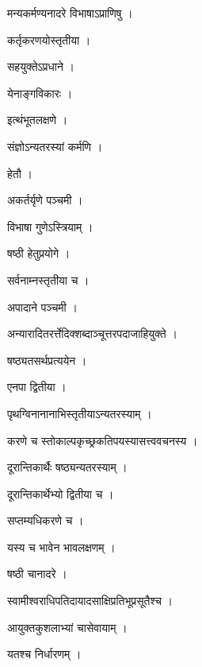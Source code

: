 \documentclass[10pt, openany]{book}
\begin{document}
\noindent मन्यकर्मण्यनादरे विभाषाऽप्राणिषु ।

\noindent कर्तृकरणयोस्तृतीया ।

\noindent सहयुक्तेऽप्रधाने ।

\noindent येनाङ्गविकारः ।

\noindent इत्थंभूतलक्षणे ।

\noindent संज्ञोऽन्यतरस्यां कर्मणि ।

\noindent हेतौ ।

\noindent अकर्तर्यृणे पञ्चमी ।

\noindent विभाषा गुणेऽस्त्रियाम् ।

\noindent षष्ठी हेतुप्रयोगे ।

\noindent सर्वनाम्नस्तृतीया च ।

\noindent अपादाने पञ्चमी ।

\noindent अन्यारादितरर्त्तेदिक्शब्दाञ्चूत्तरपदाजाहियुक्ते ।

\noindent षष्ठ्यतसर्थप्रत्ययेन ।

\noindent एनपा द्वितीया ।

\noindent पृथग्विनानानाभिस्तृतीयाऽन्यतरस्याम् ।

\noindent करणे च स्तोकाल्पकृच्छ्रकतिपयस्यासत्त्ववचनस्य ।

\noindent दूरान्तिकार्थैः षष्ठ्यन्यतरस्याम् ।

\noindent दूरान्तिकार्थेभ्यो द्वितीया च ।

\noindent सप्तम्यधिकरणे च ।

\noindent यस्य च भावेन भावलक्षणम् ।

\noindent षष्ठी चानादरे ।

\noindent स्वामीश्वराधिपतिदायादसाक्षिप्रतिभूप्रसूतैश्च ।

\noindent आयुक्तकुशलाभ्यां चासेवायाम् ।

\noindent यतश्च निर्धारणम् ।
\end{document}
